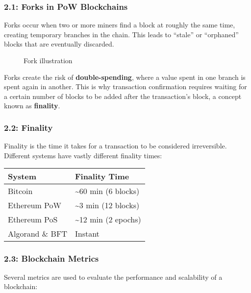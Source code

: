 \subsubsection{2.1: Forks in PoW
Blockchains}\label{forks-in-pow-blockchains}

Forks occur when two or more miners find a block at roughly the same
time, creating temporary branches in the chain. This leads to ``stale''
or ``orphaned'' blocks that are eventually discarded.

\begin{figure}
\centering
\caption{Fork illustration}
\end{figure}

Forks create the risk of \textbf{double-spending}, where a value spent
in one branch is spent again in another. This is why transaction
confirmation requires waiting for a certain number of blocks to be added
after the transaction's block, a concept known as \textbf{finality}.

\subsubsection{2.2: Finality}\label{finality}

Finality is the time it takes for a transaction to be considered
irreversible. Different systems have vastly different finality times:

\begin{longtable}[]{@{}ll@{}}
\toprule\noalign{}
System & Finality Time \\
\midrule\noalign{}
\endhead
\bottomrule\noalign{}
\endlastfoot
Bitcoin & \textasciitilde60 min (6 blocks) \\
Ethereum PoW & \textasciitilde3 min (12 blocks) \\
Ethereum PoS & \textasciitilde12 min (2 epochs) \\
Algorand \& BFT & Instant \\
\end{longtable}

\subsubsection{2.3: Blockchain Metrics}\label{blockchain-metrics}

Several metrics are used to evaluate the performance and scalability of
a blockchain:

